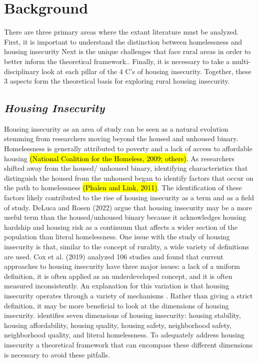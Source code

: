 \chapter{Background}	%
There are three primary areas  where the extant literature must be analyzed. First,  it is important to understand the distinction between homelessness and housing insecurity Next is the unique challenges that face rural areas in order to better inform the theoretical framework.. Finally, it is necessary to take a multi-disciplinary look at each pillar of the 4 C's of housing insecurity. Together, these 3 aspects form the theoretical basis for exploring rural housing insecurity.

\section{\textit{Housing Insecurity}}

Housing insecurity as an area of study can be seen as a natural evolution stemming from researchers moving beyond the housed and unhoused binary.  Homelessness is generally attributed to poverty and a lack of access to affordable housing \hl{(National Coalition for the Homeless, 2009; others)}.  As researchers shifted away from the housed/ unhoused binary, identifying characteristics that distinguish the housed from the unhoused began to identify factors that occur on the path to homelessness \hl{(Phalen and Link, 2011)}.  The identification of these factors likely contributed to the rise of housing insecurity as a term and as a field of study.  DeLuca and Rosen (2022) argue that housing insecurity may be a more useful term than the housed/unhoused binary because it acknowledges housing hardship and housing risk as a continuum that affects a wider section of the population than literal homelessness.  One issue with the study of housing insecurity is that, similar to the concept of rurality, a wide variety of definitions are used. Cox et al. (2019) analyzed 106 studies and found that current approaches to housing insecurity have three major issues: a lack of a uniform definition, it is often applied as an underdeveloped concept, and it is often measured inconsistently. An explanation for this variation is that housing insecurity operates through a variety of mechanisms \citep{leifheit_building_2022}.  Rather than giving a strict definition, it may be more beneficial to look at the dimensions of housing insecurity. \citet{cox_road_2019} identifies seven dimensions of housing insecurity: housing stability, housing affordability, housing quality, housing safety, neighborhood safety, neighborhood quality, and literal homelessness. To adequately address housing insecurity a theoretical framework that can encompass these different dimensions is necessary to avoid these pitfalls. 

